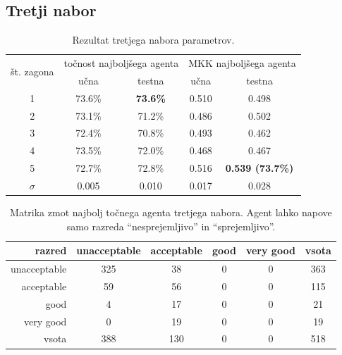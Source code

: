 \subsection{Tretji nabor}\label{subsec:dodatek-car-tretji-nabor}
\begin{table}[H]
    \begin{center}
        \begin{tabular}{|| c | c c || c c ||}
            \hline
            \multirow{2}{*}{št. zagona} & \multicolumn{2}{c||}{točnost najboljšega agenta} & \multicolumn{2}{c||}{MKK najboljšega agenta} \\ \cline{2-5}
            & učna   & testna          & učna  & testna                  \\
            \hline
            1        & 73.6\% & \textbf{73.6\%} & 0.510 & 0.498                   \\
            \hline
            2        & 73.1\% & 71.2\%          & 0.486 & 0.502                   \\
            \hline
            3        & 72.4\% & 70.8\%          & 0.493 & 0.462                   \\
            \hline
            4        & 73.5\% & 72.0\%          & 0.468 & 0.467                   \\
            \hline
            5        & 72.7\% & 72.8\%          & 0.516 & \textbf{0.539 (73.7\%)} \\
            \hline
            $\sigma$ & 0.005  & 0.010           & 0.017 & 0.028                   \\
            \hline
        \end{tabular}
    \end{center}
    \caption{Rezultat tretjega nabora parametrov.}
    \label{tab:car_result_3}
\end{table}

\begin{table}[H]
    \centering
    \begin{tabular}{||rccccc||}
        \hline
        razred       & unacceptable & acceptable & good & very good & vsota \\ \hline
        unacceptable & 325          & 38         & 0    & 0         & 363   \\ \hline
        acceptable   & 59           & 56         & 0    & 0         & 115   \\ \hline
        good         & 4            & 17         & 0    & 0         & 21    \\ \hline
        very good    & 0            & 19         & 0    & 0         & 19    \\ \hline
        vsota        & 388          & 130        & 0    & 0         & 518   \\ \hline
    \end{tabular}
    \caption{Matrika zmot najbolj točnega agenta tretjega nabora. Agent lahko napove samo razreda \enquote{nesprejemljivo} in \enquote{sprejemljivo}.}
    \label{tab:car_acc_3}
\end{table}

